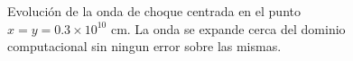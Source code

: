 \documentclass[12pt,a4paper]{book}
\begin{document}
\begin{figure}
\centering
\caption{\label{fig:HLL-relativista-no-centrado} Evolución de la onda de choque centrada en el punto $x=y = 0.3 \times 10^{10}$ cm. La onda se expande cerca del dominio computacional sin ningun error sobre las mismas.}
\end{figure}
\end{document}
